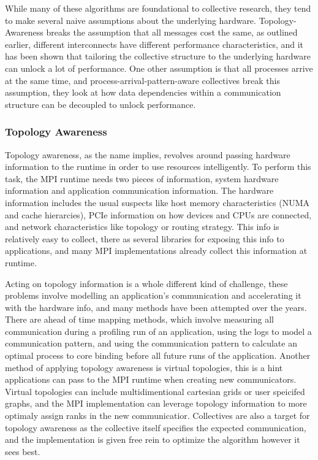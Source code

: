 While many of these algorithms are foundational to collective research, they tend to make several naive assumptions about the underlying hardware.
Topology-Awareness breaks the assumption that all messages cost the same, as outlined earlier, different interconnects have different performance characteristics, and it has been shown that tailoring the collective structure to the underlying hardware can unlock a lot of performance. 
One other assumption is that all processes arrive at the same time, and process-arrival-pattern-aware collectives break this assumption, they look at how data dependencies within a communication structure can be decoupled to unlock performance.

\subsubsection{Topology Awareness}
Topology awareness, as the name implies, revolves around passing hardware information to the runtime in order to use resources intelligently.
To perform this task, the MPI runtime needs two pieces of information, system hardware information and application communication information.
The hardware information includes the usual suspects like host memory characteristics (NUMA and cache hierarcies), PCIe information on how devices and CPUs are connected, and network characteristics like topology or routing strategy.
This info is relatively easy to collect, there as several libraries for exposing this info to applications, and many MPI implementations already collect this information at runtime.

Acting on topology information is a whole different kind of challenge, these problems involve modelling an application's communication and accelerating it with the hardware info, and many methods have been attempted over the years.
There are ahead of time mapping methods, which involve measuring all communication during a profiling run of an application, using the logs to model a communication pattern, and using the communication pattern to calculate an optimal process to core binding before all future runs of the application. 
Another method of applying topology awareness is virtual topologies, this is a hint applications can pass to the MPI runtime when creating new communicators.
Virtual topologies can include multidimentional cartesian grids or user speicifed graphs, and the MPI implementation can leverage topology information to more optimaly assign ranks in the new communicatior.
Collectives are also a target for topology awareness as the collective itself specifies the expected communication, and the implementation is given free rein to optimize the algorithm however it sees best.

